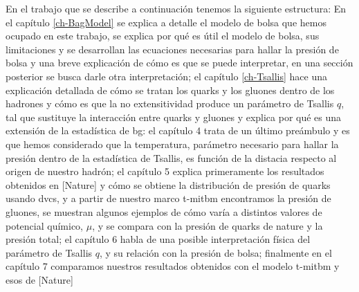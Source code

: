 En el trabajo que se describe a continuación tenemos la siguiente estructura: En el capítulo \ref{ch-BagModel} se explica a detalle el modelo de bolsa que hemos ocupado en este trabajo, se explica por qué es útil el modelo de bolsa, sus limitaciones y se desarrollan las ecuaciones necesarias para hallar la presión de bolsa y una breve explicación de cómo es que se puede interpretar, en una sección posterior se busca darle otra interpretación; el capítulo \ref{ch-Tsallis} hace una explicación detallada de cómo se tratan los quarks y los gluones dentro de los hadrones y cómo es que la no extensitividad produce un parámetro de Tsallis $q$, tal que sustituye la interacción entre quarks y gluones y explica por qué es una extensión de la estadística de \acrfull{bg}: el capítulo 4 trata de un último preámbulo y es que hemos considerado que la temperatura, parámetro necesario para hallar la presión dentro de la estadística de Tsallis, es función de la distacia respecto al origen de nuestro hadrón; el capítulo 5 explica primeramente los resultados obtenidos en [Nature] y cómo se obtiene la distribución de presión de quarks usando \acrshort{dvcs}, y a partir de nuestro marco \acrshort{t-mitbm} encontramos la presión de gluones, se muestran algunos ejemplos de cómo varía a distintos valores de potencial químico, $\mu$, y se compara con la presión de quarks de nature y la presión total; el capítulo 6 habla de una posible interpretación física del parámetro de Tsallis $q$, y su relación con la presión de bolsa; finalmente en el capítulo 7 comparamos nuestros resultados obtenidos con el modelo \acrshort{t-mitbm} y esos de [Nature]